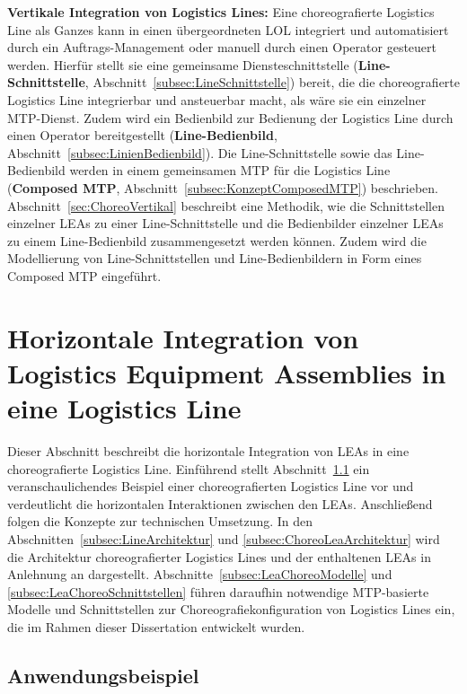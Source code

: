 \textbf{Vertikale Integration von Logistics Lines:} Eine choreografierte Logistics Line als Ganzes kann in einen übergeordneten LOL integriert und automatisiert durch ein Auftrags-Management oder manuell durch einen Operator gesteuert werden. Hierfür stellt sie eine gemeinsame Diensteschnittstelle (\textbf{Line-Schnittstelle}, Abschnitt~\ref{subsec:LineSchnittstelle}) bereit, die die choreografierte Logistics Line integrierbar und ansteuerbar macht, als wäre sie ein einzelner MTP-Dienst. Zudem wird ein Bedienbild zur Bedienung der Logistics Line durch einen Operator bereitgestellt (\textbf{Line-Bedienbild}, Abschnitt~\ref{subsec:LinienBedienbild}). Die Line-Schnittstelle sowie das Line-Bedienbild werden in einem gemeinsamen MTP für die Logistics Line (\textbf{Composed MTP}, Abschnitt~\ref{subsec:KonzeptComposedMTP}) beschrieben. Abschnitt~\ref{sec:ChoreoVertikal} beschreibt eine Methodik, wie die Schnittstellen einzelner LEAs zu einer Line-Schnittstelle und die Bedienbilder einzelner LEAs zu einem Line-Bedienbild zusammengesetzt werden können. Zudem wird die Modellierung von Line-Schnittstellen und Line-Bedienbildern in Form eines Composed MTP eingeführt.

\section{Horizontale Integration von Logistics Equipment Assemblies in eine Logistics Line}
\label{sec:ChoreoHorizontal}

Dieser Abschnitt beschreibt die horizontale Integration von LEAs in eine choreografierte Logistics Line. Einführend stellt Abschnitt~\ref{subsec:EinfuehrungsBeispielLL} ein veranschaulichendes Beispiel einer choreografierten Logistics Line vor und verdeutlicht die horizontalen Interaktionen zwischen den LEAs. Anschließend folgen die Konzepte zur technischen Umsetzung. In den Abschnitten~\ref{subsec:LineArchitektur} und \ref{subsec:ChoreoLeaArchitektur} wird die Architektur choreografierter Logistics Lines und der enthaltenen LEAs in Anlehnung an \cite{Stutz.2026} dargestellt. Abschnitte~\ref{subsec:LeaChoreoModelle} und \ref{subsec:LeaChoreoSchnittstellen} führen daraufhin notwendige MTP-basierte Modelle und Schnittstellen zur Choreografiekonfiguration von Logistics Lines ein, die im Rahmen dieser Dissertation entwickelt wurden. 

\subsection{Anwendungsbeispiel}
\label{subsec:EinfuehrungsBeispielLL}

